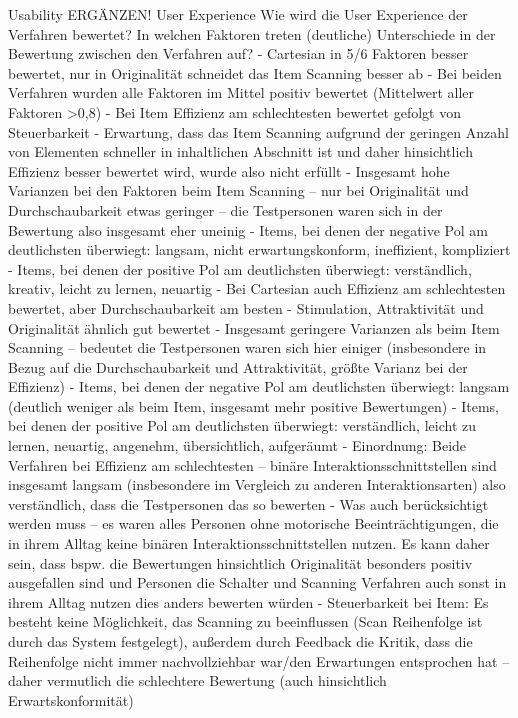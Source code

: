 Usability 
ERGÄNZEN!
User Experience
Wie wird die User Experience der Verfahren bewertet? In welchen Faktoren treten (deutliche) Unterschiede in der Bewertung zwischen den Verfahren auf? 
-	Cartesian in 5/6 Faktoren besser bewertet, nur in Originalität schneidet das Item Scanning besser ab 
-	Bei beiden Verfahren wurden alle Faktoren im Mittel positiv bewertet (Mittelwert aller Faktoren >0,8) 
-	Bei Item Effizienz am schlechtesten bewertet gefolgt von Steuerbarkeit 
-	Erwartung, dass das Item Scanning aufgrund der geringen Anzahl von Elementen schneller in inhaltlichen Abschnitt ist und daher hinsichtlich Effizienz besser bewertet wird, wurde also nicht erfüllt 
-	Insgesamt hohe Varianzen bei den Faktoren beim Item Scanning – nur bei Originalität und Durchschaubarkeit etwas geringer – die Testpersonen waren sich in der Bewertung also insgesamt eher uneinig 
-	Items, bei denen der negative Pol am deutlichsten überwiegt: langsam, nicht erwartungskonform, ineffizient, kompliziert 
-	Items, bei denen der positive Pol am deutlichsten überwiegt: verständlich, kreativ, leicht zu lernen, neuartig
-	Bei Cartesian auch Effizienz am schlechtesten bewertet, aber Durchschaubarkeit am besten 
-	Stimulation, Attraktivität und Originalität ähnlich gut bewertet 
-	Insgesamt geringere Varianzen als beim Item Scanning – bedeutet die Testpersonen waren sich hier einiger (insbesondere in Bezug auf die Durchschaubarkeit und Attraktivität, größte Varianz bei der Effizienz) 
-	Items, bei denen der negative Pol am deutlichsten überwiegt: langsam (deutlich weniger als beim Item, insgesamt mehr positive Bewertungen)
-	Items, bei denen der positive Pol am deutlichsten überwiegt: verständlich, leicht zu lernen, neuartig, angenehm, übersichtlich, aufgeräumt
-	Einordnung: Beide Verfahren bei Effizienz am schlechtesten – binäre Interaktionsschnittstellen sind insgesamt langsam (insbesondere im Vergleich zu anderen Interaktionsarten) also verständlich, dass die Testpersonen das so bewerten 
-	Was auch berücksichtigt werden muss – es waren alles Personen ohne motorische Beeinträchtigungen, die in ihrem Alltag keine binären Interaktionsschnittstellen nutzen. Es kann daher sein, dass bspw. die Bewertungen hinsichtlich Originalität besonders positiv ausgefallen sind und Personen die Schalter und Scanning Verfahren auch sonst in ihrem Alltag nutzen dies anders bewerten würden 
-	Steuerbarkeit bei Item: Es besteht keine Möglichkeit, das Scanning zu beeinflussen (Scan Reihenfolge ist durch das System festgelegt), außerdem durch Feedback die Kritik, dass die Reihenfolge nicht immer nachvollziehbar war/den Erwartungen entsprochen hat – daher vermutlich die schlechtere Bewertung (auch hinsichtlich Erwartskonformität)
